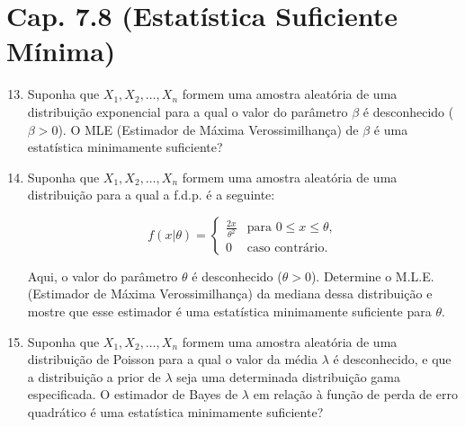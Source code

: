 \documentclass[leqno, 12pt]{article}
\theoremstyle{definition}
\newcommand{\rs}{X_1, X_2, \ldots, X_n} %
\begin{document}
\section*{Cap. 7.8 (Estatística Suficiente Mínima)}

\begin{enumerate}
\setcounter{enumi}{12}


\item \textbf{\parencite[ex. 8, pág. 455]{DeGroot:2014}} Suponha que \(\rs\) formem uma amostra aleatória de uma distribuição exponencial para a qual o valor do parâmetro \(\beta\) é desconhecido (\(\beta > 0\)). O MLE (Estimador de Máxima Verossimilhança) de \(\beta\) é uma estatística minimamente suficiente?


\item \textbf{\parencite[ex. 12, pág. 455]{DeGroot:2014}} Suponha que \(\rs\) formem uma amostra aleatória de uma distribuição para a qual a f.d.p. é a seguinte:

\[
f(x|\theta) =
\begin{cases}
\frac{2x}{\theta^2} & \text{para } 0 \leq x \leq \theta, \\
0 & \text{caso contrário.}
\end{cases}
\]

Aqui, o valor do parâmetro \(\theta\) é desconhecido (\(\theta > 0\)). Determine o M.L.E. (Estimador de Máxima Verossimilhança) da mediana dessa distribuição e mostre que esse estimador é uma estatística minimamente suficiente para \(\theta\).


\item \textbf{\parencite[ex. 16, pág. 455]{DeGroot:2014}} Suponha que \(\rs\) formem uma amostra aleatória de uma distribuição de Poisson para a qual o valor da média \(\lambda\) é desconhecido, e que a distribuição a prior de \(\lambda\) seja uma determinada distribuição gama especificada. O estimador de Bayes de \(\lambda\) em relação à função de perda de erro quadrático é uma estatística minimamente suficiente?

\end{enumerate}
\end{document}
